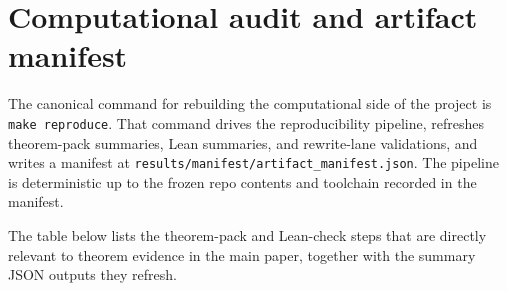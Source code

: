 \section{Computational audit and artifact manifest}
The canonical command for rebuilding the computational side of the project is \texttt{make reproduce}.
That command drives the reproducibility pipeline, refreshes theorem-pack summaries, Lean summaries, and rewrite-lane validations, and writes a manifest at \texttt{results/manifest/artifact\_manifest.json}.
The pipeline is deterministic up to the frozen repo contents and toolchain recorded in the manifest.



The table below lists the theorem-pack and Lean-check steps that are directly relevant to theorem evidence in the main paper, together with the summary JSON outputs they refresh.


